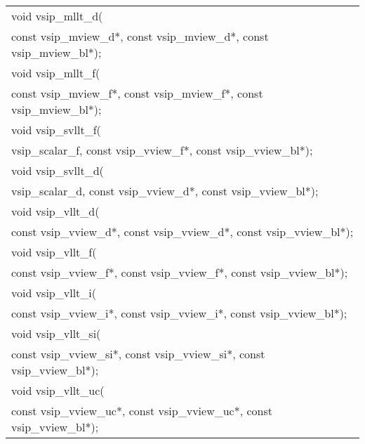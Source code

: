\afh
{
\ttfamily
\\\hspace*{.04\textwidth}\begin{tabular}[H]{l}
void vsip\_mllt\_d(\\*\hspace{1cm}const vsip\_mview\_d*, const vsip\_mview\_d*, const vsip\_mview\_bl*);\\
void vsip\_mllt\_f(\\*\hspace{1cm}const vsip\_mview\_f*, const vsip\_mview\_f*, const vsip\_mview\_bl*);\\
void vsip\_svllt\_f(\\*\hspace{1cm}vsip\_scalar\_f, const vsip\_vview\_f*, const vsip\_vview\_bl*);\\
void vsip\_svllt\_d(\\*\hspace{1cm}vsip\_scalar\_d, const vsip\_vview\_d*, const vsip\_vview\_bl*);\\
void vsip\_vllt\_d(\\*\hspace{1cm}const vsip\_vview\_d*, const vsip\_vview\_d*, const vsip\_vview\_bl*);\\
void vsip\_vllt\_f(\\*\hspace{1cm}const vsip\_vview\_f*, const vsip\_vview\_f*, const vsip\_vview\_bl*);\\
void vsip\_vllt\_i(\\*\hspace{1cm}const vsip\_vview\_i*, const vsip\_vview\_i*, const vsip\_vview\_bl*);\\
void vsip\_vllt\_si(\\*\hspace{1cm}const vsip\_vview\_si*, const vsip\_vview\_si*, const vsip\_vview\_bl*);\\
void vsip\_vllt\_uc(\\*\hspace{1cm}const vsip\_vview\_uc*, const vsip\_vview\_uc*, const vsip\_vview\_bl*);\\
\end{tabular}
}
\\\cvsiplh
\\\pyjvsiph
{}
